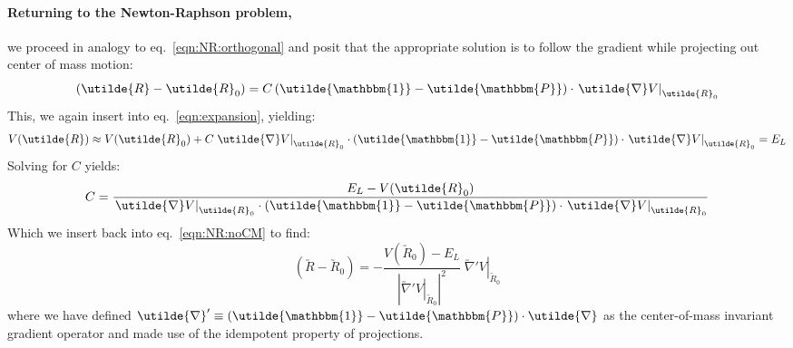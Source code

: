 \documentclass[letter,11pt]{article}
\newcommand{\cvec}[1]{\utilde{#1}}
\newcommand{\laeq}[1]{\label{eqn:#1}}
\newcommand{\refeq}[1]{eq.~\ref{eqn:#1}}
\newcommand{\MM}{\mathfrak{M_2}}
\begin{document}

\paragraph{Returning to the  Newton-Raphson problem,} we proceed in analogy to \refeq{NR:orthogonal} and posit that the appropriate solution is to follow the gradient while projecting out center of mass motion:
\begin{equation}\laeq{NR:noCM}
  (\cvec{R} - \cvec{R}_0) = C \left( \cvec{\mathbbm{1}} - \cvec{\mathbbm{P}} \right) \cdot \left. \cvec{\nabla} V\right|_{\cvec{R}_0}
\end{equation}
This, we again insert into \refeq{expansion}, yielding:
\begin{align}
  V(\cvec{R}) \approx  V(\cvec{R}_0) + C \left. \cvec{\nabla}V\right|_{\cvec{R}_0} \cdot \left( \cvec{\mathbbm{1}} - \cvec{\mathbbm{P}} \right) \cdot \left. \cvec{\nabla} V\right|_{\cvec{R}_0} = E_L
\end{align}
Solving for $C$ yields:
\[
  C = \frac{E_L - V(\cvec{R}_0)}{\left. \cvec{\nabla} V\right|_{\cvec{R}_0} \cdot \left( \cvec{\mathbbm{1}} - \cvec{\mathbbm{P}} \right) \cdot \left. \cvec{\nabla} V\right|_{\cvec{R}_0}}
\]
Which we insert back into \refeq{NR:noCM} to find:
\begin{equation}\laeq{dR:noCM}
  (\cvec{R} - \cvec{R}_0) = - \frac{V \left(\cvec{R}_0\right) - E_L}{ {\left| {\left. \cvec{\nabla}'V \right|}_{\cvec{R}_0} \right|}^2} \; {\left. \cvec{\nabla}'V \right|}_{\cvec{R}_0}
\end{equation}
where we have defined $\cvec{\nabla}' \equiv \left( \cvec{\mathbbm{1}} - \cvec{\mathbbm{P}} \right) \cdot \cvec{\nabla}$ as the center-of-mass invariant gradient operator and made use of the idempotent property of projections. 
\end{document}
